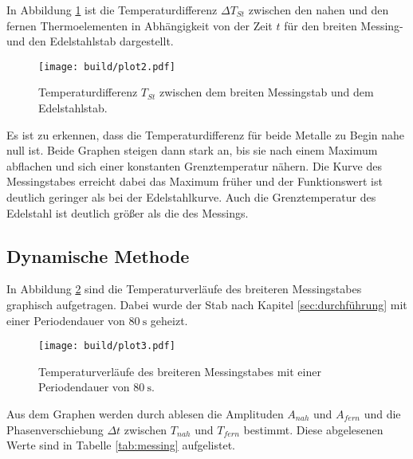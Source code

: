 \noindent
In Abbildung \ref{fig:diff} ist die Temperaturdifferenz $\Delta T_{St}$ zwischen den nahen und den fernen Thermoelementen in Abhängigkeit 
von der Zeit $t$ für den breiten Messing- und den Edelstahlstab dargestellt. 

\begin{figure}[H]
    \centering
    \texttt{[image: build/plot2.pdf]}
    \caption{Temperaturdifferenz $T_{St}$ zwischen dem breiten Messingstab und dem Edelstahlstab.}
    \label{fig:diff}
\end{figure}

\noindent
Es ist zu erkennen, dass die Temperaturdifferenz für beide Metalle zu Begin nahe null ist. Beide Graphen steigen dann stark an, bis sie 
nach einem Maximum abflachen und sich einer konstanten Grenztemperatur nähern. Die Kurve des Messingstabes erreicht dabei das Maximum früher 
und der Funktionswert ist deutlich geringer als bei der Edelstahlkurve. Auch die Grenztemperatur des Edelstahl ist deutlich größer als die des
Messings. 

\subsection{Dynamische Methode}
\label{sec:ad}
In Abbildung \ref{fig:messing} sind die Temperaturverläufe des breiteren Messingstabes graphisch aufgetragen. Dabei wurde der Stab nach Kapitel
\ref{sec:durchführung} mit einer Periodendauer von $\SI{80}{\second}$ geheizt.

\begin{figure}[H]
    \centering
    \texttt{[image: build/plot3.pdf]}
    \caption{Temperaturverläufe des breiteren Messingstabes mit einer Periodendauer von $\SI{80}{\second}$.}
    \label{fig:messing}
\end{figure}
\noindent

Aus dem Graphen werden durch ablesen die Amplituden $A_{nah}$ und $A_{fern}$ und die Phasenverschiebung $\Delta t$ zwischen $T_{nah}$ und 
$T_{fern}$ bestimmt. Diese abgelesenen Werte sind in Tabelle \ref{tab:messing}  aufgelistet. 

